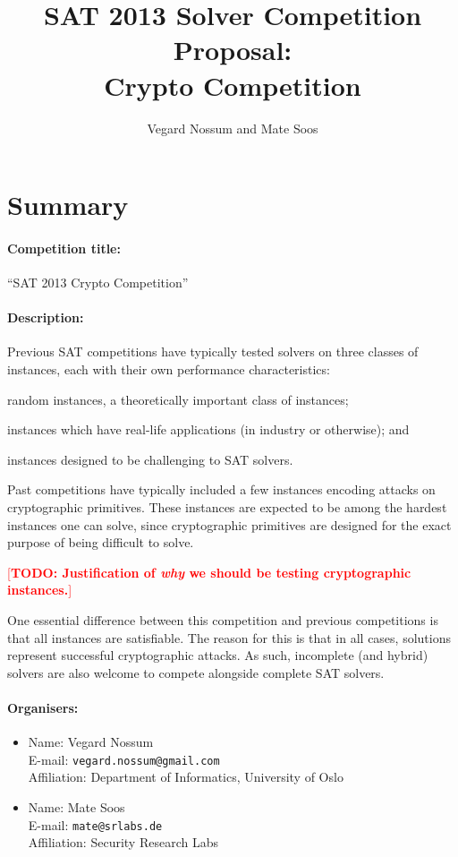 \documentclass[12pt, a4paper]{article}
\title{SAT 2013 Solver Competition Proposal: \\ Crypto Competition}
\author{Vegard Nossum and Mate Soos}
\newcommand{\XXX}[1]{\textcolor{red}{[\textbf{#1}]}}
\begin{document}
\maketitle


\section{Summary}

\paragraph{Competition title:} “SAT 2013 Crypto Competition”

\paragraph{Description:}
Previous SAT competitions have typically tested solvers on three classes of instances, each with their own performance characteristics:
\begin{inparaenum}
\item random instances, a theoretically important class of instances;
\item instances which have real-life applications (in industry or otherwise); and
\item instances designed to be challenging to SAT solvers.
\end{inparaenum}

Past competitions have typically included a few instances encoding attacks on cryptographic primitives. These instances are expected to be among the hardest instances one can solve, since cryptographic primitives are designed for the exact purpose of being difficult to solve.

\XXX{TODO: Justification of \emph{why} we should be testing cryptographic instances.}

One essential difference between this competition and previous competitions is that all instances are satisfiable. The reason for this is that in all cases, solutions represent successful cryptographic attacks. As such, incomplete (and hybrid) solvers are also welcome to compete alongside complete SAT solvers.


\paragraph{Organisers:}
\begin{itemize}
\item Name: Vegard Nossum \\ E-mail: \texttt{vegard.nossum@gmail.com} \\ Affiliation: Department of Informatics, University of Oslo
\item Name: Mate Soos \\ E-mail: \texttt{mate@srlabs.de} \\ Affiliation: Security Research Labs
\end{itemize}
\end{document}
